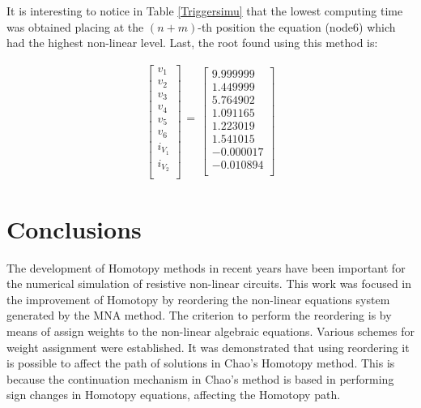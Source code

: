 \documentclass[conference,letterpaper,onecolumn,11pt]{IEEEtran}
\begin{document}
It is interesting to notice in Table \ref{Triggersimu} that the lowest computing time was obtained placing at the $(n+m)$-th position the equation (node6) which had the highest non-linear level. Last, the root found using this method is:

\begin{displaymath}
\begin{array}{r}
\left[\begin{array}{r}
v_1 \\ v_2  \\ v_3  \\ v_4 \\ v_5  \\ v_6  \\
i_{V_1}  \\ i_{V_2}  \\ 
\end{array}\right]
\begin{array}{r}
 \\
= \\
  \\
\end{array}
\left[\begin{array}{r}
 9.999999\\ 1.449999 \\ 5.764902\\ 1.091165\\ 1.223019\\ 1.541015\\
 -0.000017\\ -0.010894\\
\end{array}\right]
\end{array}
\end{displaymath}

\section{Conclusions}

The development of Homotopy methods in recent years have been important for the numerical simulation of resistive non-linear circuits. This work was focused in the improvement of Homotopy by reordering the non-linear equations system generated by the MNA method. The criterion to perform the reordering is by means of assign weights to the non-linear algebraic equations. Various schemes for weight assignment were established. It was demonstrated that using reordering it is possible to affect the path of solutions in Chao's Homotopy method. This is because the continuation mechanism in Chao's method is based in performing sign changes in Homotopy equations, affecting the Homotopy path.



\end{document}
